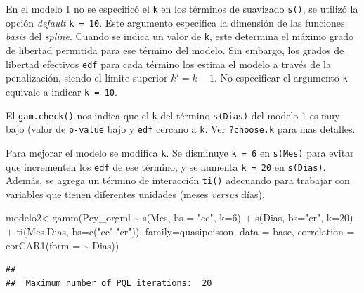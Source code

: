 \documentclass[
]{book}
\newenvironment{Shaded}{\begin{snugshade}}{\end{snugshade}}
\newcommand{\AttributeTok}[1]{\textcolor[rgb]{0.77,0.63,0.00}{#1}}
\newcommand{\DecValTok}[1]{\textcolor[rgb]{0.00,0.00,0.81}{#1}}
\newcommand{\FunctionTok}[1]{\textcolor[rgb]{0.00,0.00,0.00}{#1}}
\newcommand{\NormalTok}[1]{#1}
\newcommand{\OtherTok}[1]{\textcolor[rgb]{0.56,0.35,0.01}{#1}}
\newcommand{\SpecialCharTok}[1]{\textcolor[rgb]{0.00,0.00,0.00}{#1}}
\newcommand{\StringTok}[1]{\textcolor[rgb]{0.31,0.60,0.02}{#1}}
\begin{document}
En el modelo 1 no se especificó el \texttt{k} en los términos de suavizado \texttt{s()}, se utilizó la opción \emph{default} \texttt{k\ =\ 10}. Este argumento especifica la dimensión de las funciones \emph{basis} del \emph{spline}. Cuando se indica un valor de \texttt{k}, este determina el máximo grado de libertad permitida para ese término del modelo. Sin embargo, los grados de libertad efectivos \texttt{edf} para cada término los estima el modelo a través de la penalización, siendo el límite superior \(k' = k - 1\). No especificar el argumento \texttt{k} equivale a indicar \texttt{k\ =\ 10}.

El \texttt{gam.check()} nos indica que el \texttt{k} del término \texttt{s(Dias)} del modelo 1 es muy bajo (valor de \texttt{p-value} bajo y \texttt{edf} cercano a \texttt{k\textquotesingle{}}. Ver \texttt{?choose.k} para mas detalles.

Para mejorar el modelo se modifica \texttt{k}. Se disminuye \texttt{k\ =\ 6} en \texttt{s(Mes)} para evitar que incrementen los \texttt{edf} de ese término, y se aumenta \texttt{k\ =\ 20} en \texttt{s(Dias)}. Además, se agrega un término de interacción \texttt{ti()} adecuando para trabajar con variables que tienen diferentes unidades (meses \emph{versus} días).

\begin{Shaded}
\begin{Highlighting}[]
\NormalTok{modelo2}\OtherTok{\textless{}{-}}\FunctionTok{gamm}\NormalTok{(Pcy\_orgml }\SpecialCharTok{\textasciitilde{}} \FunctionTok{s}\NormalTok{(Mes, }\AttributeTok{bs =} \StringTok{"cc"}\NormalTok{, }\AttributeTok{k=}\DecValTok{6}\NormalTok{) }\SpecialCharTok{+} \FunctionTok{s}\NormalTok{(Dias, }\AttributeTok{bs=}\StringTok{"cr"}\NormalTok{, }\AttributeTok{k=}\DecValTok{20}\NormalTok{) }
              \SpecialCharTok{+} \FunctionTok{ti}\NormalTok{(Mes,Dias, }\AttributeTok{bs=}\FunctionTok{c}\NormalTok{(}\StringTok{"cc"}\NormalTok{,}\StringTok{"cr"}\NormalTok{)), }\AttributeTok{family=}\NormalTok{quasipoisson, }
              \AttributeTok{data =}\NormalTok{ base, }\AttributeTok{correlation =} \FunctionTok{corCAR1}\NormalTok{(}\AttributeTok{form =} \SpecialCharTok{\textasciitilde{}}\NormalTok{ Dias))}
\end{Highlighting}
\end{Shaded}

\begin{verbatim}
## 
##  Maximum number of PQL iterations:  20
\end{verbatim}
\end{document}
